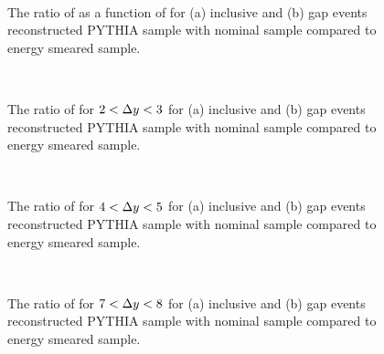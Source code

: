 \begin{figure}
\centering
\mbox{
              \quad
              \quad
                              }
\caption[]{
The ratio of \mean{\costwodphi{}} as a function of \dy{} for (a) inclusive and (b) gap events reconstructed PYTHIA sample with nominal sample compared to energy smeared sample.
\label{GBJ2:ResoEnergy:cos2}}
\end{figure}


\begin{figure}
\centering
\mbox{
              \quad
              \quad
                              }
\caption[]{
The ratio of \dphiDist{} for $2<\mbox{$\Delta y$}{}<3$ for (a) inclusive and (b) gap events reconstructed PYTHIA sample with nominal sample compared to energy smeared sample.
\label{GBJ2:ResoEnergy:dphi23}}
\end{figure}


\begin{figure}
\centering
\mbox{
              \quad
              \quad
                              }
\caption[]{
The ratio of \dphiDist{} for $4<\mbox{$\Delta y$}{}<5$ for (a) inclusive and (b) gap events reconstructed PYTHIA sample with nominal sample compared to energy smeared sample.
\label{GBJ2:ResoEnergy:dphi45}}
\end{figure}



\begin{figure}
\centering
\mbox{
              \quad
              \quad
                              }
\caption[]{
The ratio of \dphiDist{} for $7<\mbox{$\Delta y$}{}<8$ for (a) inclusive and (b) gap events reconstructed PYTHIA sample with nominal sample compared to energy smeared sample.
\label{GBJ2:ResoEnergy:dphi78}}
\end{figure}


